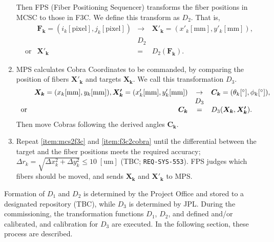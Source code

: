 \begin{enumerate}
Then FPS (Fiber Positioning Sequencer) transforms the fiber positions in MCSC to those in F3C.
We define this transform as $D_2$.
That is,
\begin{equation}
\begin{array}{crcl}
& \bm{F_k}=(i_k [ \mathrm{pixel} ], j_k [ \mathrm{pixel} ]) & \rightarrow & \bm{X'_k}=(x'_k [ \mathrm{mm} ], y'_k [ \mathrm{mm} ]), \\
& & D_2 & \\
\mathrm{or} & \bm{X'_k} & = & D_2(\bm{F_k}).
\end{array}
\end{equation}
\item\label{item:f3c2cobra} MPS calculates Cobra Coordinates to be commanded, by comparing the position of fibers $\bm{X'_k}$ and targets $\bm{X_k}$.
We call this transformation $D_3$.
\begin{equation}
\begin{array}{crcl}
& \bm{X_k}=(x_k [ \mathrm{mm} ], y_k [ \mathrm{mm} ]), \bm{X'_k}=(x'_k [ \mathrm{mm} ], y'_k [ \mathrm{mm} ]) & \rightarrow & \bm{C_k}=(\theta _k [ ^\circ ], \phi _k [ ^\circ ]) ,\\
& & D_3 & \\
\mathrm{or} & \bm{C_k} & = & D_3(\bm{X_k},\bm{X'_k}).
\end{array}
\end{equation}
Then move Cobras following the derived angles $\bm{C_k}$.
\item Repeat \ref{item:mcs2f3c} and \ref{item:f3c2cobra} until the differential between the target and the fiber positions meets the required accuracy; $\Delta r_k= \sqrt{ \Delta x_k^2 + \Delta y_k^2} \leq 10 \;\mathrm{[um]}$ (TBC; {\tt REQ-SYS-553}).
FPS judges which fibers should be moved, and sends $\bm{X_k}$ and $\bm{X'_k}$ to MPS.
\end{enumerate} 

Formation of $D_1$ and $D_2$ is determined by the Project Office and stored to a designated repository (TBC), while $D_3$ is determined by JPL.
During the commissioning, the transformation functions $D_1$, $D_2$, and defined and/or calibrated, and calibration for $D_3$ are executed.
In the following section, these process are described.

